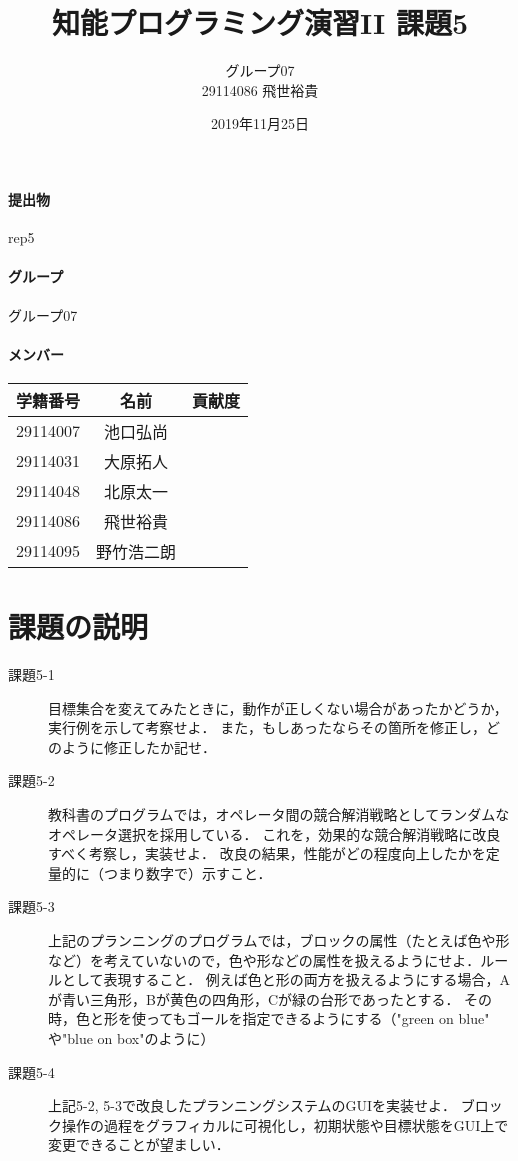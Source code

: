 \documentclass[a4j]{jarticle}
\title{知能プログラミング演習II 課題5}
\author{グループ07\\
  29114086 飛世裕貴\\
}
\date{2019年11月25日}
\begin{document}
\maketitle

\paragraph{提出物} rep5
\paragraph{グループ} グループ07
\paragraph{メンバー}
\begin{tabular}{|c|c|c|}
  \hline\hline
  学籍番号&名前&貢献度\\
  \hline\hline
  29114007&池口弘尚&\\
  \hline
  29114031&大原拓人&\\
  \hline
  29114048&北原太一&\\
  \hline
  29114086&飛世裕貴&\\
  \hline
  29114095&野竹浩二朗&\\
  \hline
\end{tabular}



\section{課題の説明}
\begin{description}
\item[課題5-1] 目標集合を変えてみたときに，動作が正しくない場合があったかどうか，実行例を示して考察せよ．
また，もしあったならその箇所を修正し，どのように修正したか記せ．

\item[課題5-2] 教科書のプログラムでは，オペレータ間の競合解消戦略としてランダムなオペレータ選択を採用している．
これを，効果的な競合解消戦略に改良すべく考察し，実装せよ．
改良の結果，性能がどの程度向上したかを定量的に（つまり数字で）示すこと．

\item[課題5-3] 上記のプランニングのプログラムでは，ブロックの属性（たとえば色や形など）を考えていないので，色や形などの属性を扱えるようにせよ．ルールとして表現すること．
例えば色と形の両方を扱えるようにする場合，Aが青い三角形，Bが黄色の四角形，Cが緑の台形であったとする．
その時，色と形を使ってもゴールを指定できるようにする（"green on blue" や"blue on box"のように）

\item[課題5-4]上記5-2, 5-3で改良したプランニングシステムのGUIを実装せよ．
ブロック操作の過程をグラフィカルに可視化し，初期状態や目標状態をGUI上で変更できることが望ましい．

\end{description}
\end{document}
